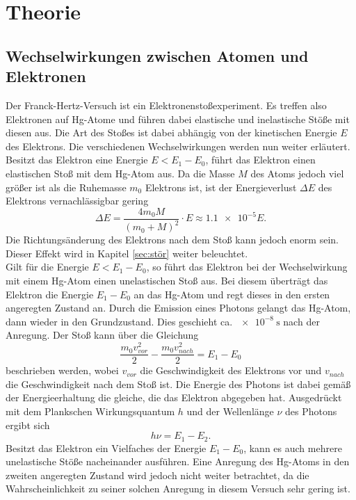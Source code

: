 \section{Theorie}
\label{sec:Theorie}

\subsection{Wechselwirkungen zwischen Atomen und Elektronen}
\label{sec:wechsel}
Der Franck-Hertz-Versuch ist ein Elektronenstoßexperiment. Es treffen also Elektronen auf Hg-Atome und führen dabei elastische und 
inelastische Stöße mit diesen aus. Die Art des Stoßes ist dabei abhängig von der kinetischen Energie $E$ des Elektrons. Die verschiedenen 
Wechselwirkungen werden nun weiter erläutert.
\\\noindent
Besitzt das Elektron eine Energie $E<E_1-E_0$, führt das Elektron einen elastischen Stoß mit dem Hg-Atom aus. Da die Masse $M$ des Atoms 
jedoch viel größer ist als die Ruhemasse $m_0$ Elektrons ist, ist der Energieverlust $\Delta E$ des Elektrons vernachlässigbar gering
\begin{equation*}
    \Delta E=\frac{4m_0M}{(m_0+M)^2}\cdot E\approx \num{1.1e-5}E    .
\end{equation*} 
Die Richtungsänderung des Elektrons nach dem Stoß kann jedoch enorm sein. Dieser Effekt wird in Kapitel \ref{sec:stör} weiter beleuchtet.
\\\noindent
Gilt für die Energie $E<E_1-E_0$, so führt das Elektron bei der Wechselwirkung mit einem Hg-Atom einen unelastischen Stoß aus. Bei diesem
überträgt das Elektron die Energie $E_1-E_0$ an das Hg-Atom und regt dieses in den ersten angeregten Zustand an. Durch die Emission eines
Photons gelangt das Hg-Atom, dann wieder in den Grundzustand. Dies geschieht ca. $\SI{e-8}{\second}$ nach der Anregung. Der Stoß kann über 
die Gleichung 
\begin{equation}
    \frac{m_0v_{vor}^2}{2}-\frac{m_0v_{nach}^2}{2}=E_1-E_0
    \label{eqn:stoß}
\end{equation}
beschrieben werden, wobei $v_{vor}$ die Geschwindigkeit des Elektrons vor und $v_{nach}$ die Geschwindigkeit nach dem Stoß ist. 
Die Energie des Photons ist dabei gemäß der Energieerhaltung die gleiche, die das Elektron abgegeben hat.
Ausgedrückt mit dem Plankschen Wirkungsquantum $h$ und der Wellenlänge $\nu$ des Photons ergibt sich 
\begin{equation}
    h\nu=E_1-E_2    .
    \label{eqn:photon}
\end{equation}
Besitzt das Elektron ein Vielfaches der Energie $E_1-E_0$, kann es auch mehrere unelastische Stöße nacheinander ausführen. Eine Anregung 
des Hg-Atoms in den zweiten angeregten Zustand wird jedoch nicht weiter betrachtet, da die Wahrscheinlichkeit zu seiner solchen Anregung
in diesem Versuch sehr gering ist.

